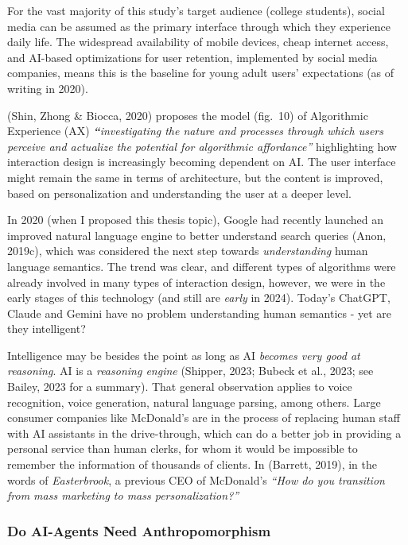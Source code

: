 \documentclass[
  letterpaper,
  DIV=11,
  numbers=noendperiod]{scrartcl}
\begin{document}
For the vast majority of this study's target audience (college
students), social media can be assumed as the primary interface through
which they experience daily life. The widespread availability of mobile
devices, cheap internet access, and AI-based optimizations for user
retention, implemented by social media companies, means this is the
baseline for young adult users' expectations (as of writing in 2020).

(Shin, Zhong \& Biocca, 2020) proposes the model (fig.~10) of
Algorithmic Experience (AX) \emph{\textbf{``}investigating the nature
and processes through which users perceive and actualize the potential
for algorithmic affordance''} highlighting how interaction design is
increasingly becoming dependent on AI. The user interface might remain
the same in terms of architecture, but the content is improved, based on
personalization and understanding the user at a deeper level.

In 2020 (when I proposed this thesis topic), Google had recently
launched an improved natural language engine to better understand search
queries (Anon, 2019c), which was considered the next step towards
\emph{understanding} human language semantics. The trend was clear, and
different types of algorithms were already involved in many types of
interaction design, however, we were in the early stages of this
technology (and still are \emph{early} in 2024). Today's ChatGPT, Claude
and Gemini have no problem understanding human semantics - yet are they
intelligent?

Intelligence may be besides the point as long as AI \emph{becomes very
good at reasoning}. AI is a \emph{reasoning engine} (Shipper, 2023;
Bubeck et al., 2023; see Bailey, 2023 for a summary). That general
observation applies to voice recognition, voice generation, natural
language parsing, among others. Large consumer companies like McDonald's
are in the process of replacing human staff with AI assistants in the
drive-through, which can do a better job in providing a personal service
than human clerks, for whom it would be impossible to remember the
information of thousands of clients. In (Barrett, 2019), in the words of
\emph{Easterbrook}, a previous CEO of McDonald's \emph{``How do you
transition from mass marketing to mass personalization?''}

\subsubsection{Do AI-Agents Need
Anthropomorphism}\label{do-ai-agents-need-anthropomorphism}
\end{document}
